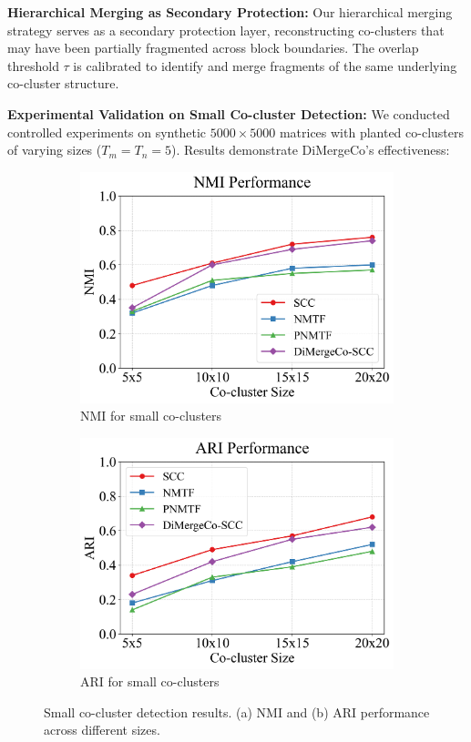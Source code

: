 \documentclass{ar2rc}
\begin{document}
\textbf{Hierarchical Merging as Secondary Protection:} Our hierarchical merging strategy serves as a secondary protection layer, reconstructing co-clusters that may have been partially fragmented across block boundaries. The overlap threshold $\tau$ is calibrated to identify and merge fragments of the same underlying co-cluster structure.

\textbf{Experimental Validation on Small Co-cluster Detection:} We conducted controlled experiments on synthetic $5000 \times 5000$ matrices with planted co-clusters of varying sizes ($T_m = T_n = 5$). Results demonstrate DiMergeCo's effectiveness:

\begin{figure}[t]
  \centering
  \begin{subfigure}[b]{0.48\textwidth}
    \centering
    \includegraphics[width=\linewidth]{images/nmi_small.png}
    \caption{NMI for small co-clusters}
    \label{fig:nmi_small}
  \end{subfigure}
  \hfill
  \begin{subfigure}[b]{0.48\textwidth}
    \centering
    \includegraphics[width=\linewidth]{images/ari_small.png}
    \caption{ARI for small co-clusters}
    \label{fig:ari_small}
  \end{subfigure}
  \caption{Small co-cluster detection results. (a) NMI and (b) ARI performance across different sizes.}
  \label{fig:small-co-cluster-detection}
\end{figure}
\end{document}
